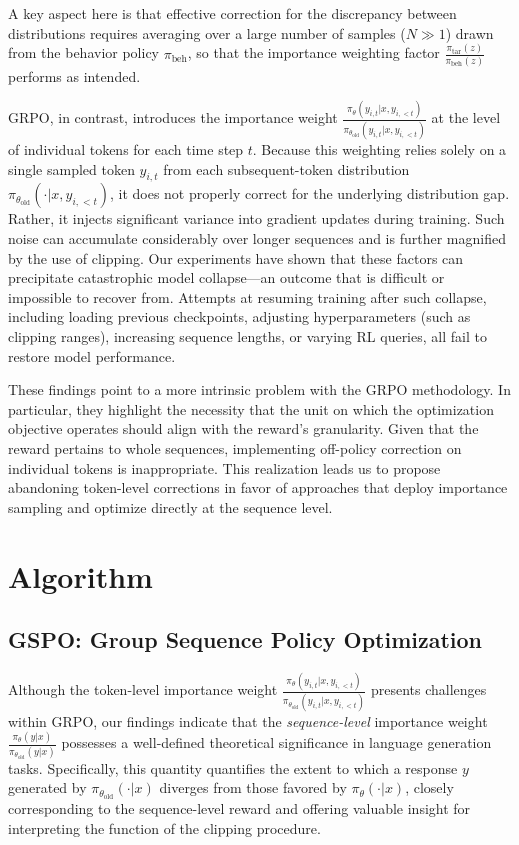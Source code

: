 A key aspect here is that effective correction for the discrepancy between distributions requires averaging over a large number of samples ($N \gg 1$) drawn from the behavior policy $\pi_\text{beh}$, so that the importance weighting factor $\frac{ \pi_\text{tar} (z) }{ \pi_\text{beh} (z)}$ performs as intended.

GRPO, in contrast, introduces the importance weight $\frac{ \pi_{\theta} (y_{i,t} | x, y_{i,<t}) }{ \pi_{\theta_\text{old}} (y_{i,t} | x,y_{i,<t})}$ at the level of individual tokens for each time step $t$. Because this weighting relies solely on a single sampled token $y_{i,t}$ from each subsequent-token distribution $\pi_{\theta_\text{old}}( \cdot | x, y_{i, <t})$, it does not properly correct for the underlying distribution gap. Rather, it injects significant variance into gradient updates during training. Such noise can accumulate considerably over longer sequences and is further magnified by the use of clipping. Our experiments have shown that these factors can precipitate catastrophic model collapse—an outcome that is difficult or impossible to recover from. Attempts at resuming training after such collapse, including loading previous checkpoints, adjusting hyperparameters (such as clipping ranges), increasing sequence lengths, or varying RL queries, all fail to restore model performance.

These findings point to a more intrinsic problem with the GRPO methodology. In particular, they highlight the necessity that the unit on which the optimization objective operates should align with the reward's granularity. Given that the reward pertains to whole sequences, implementing off-policy correction on individual tokens is inappropriate. This realization leads us to propose abandoning token-level corrections in favor of approaches that deploy importance sampling and optimize directly at the sequence level.

\section{Algorithm}

\subsection{GSPO: Group Sequence Policy Optimization}

Although the token-level importance weight $\frac{ \pi_{\theta} (y_{i,t} | x, y_{i,<t}) }{ \pi_{\theta_\text{old}} (y_{i,t} | x,y_{i,<t})}$ presents challenges within GRPO, our findings indicate that the \textit{sequence-level} importance weight $\frac{ \pi_{\theta} (y | x) }{ \pi_{\theta_\text{old}} (y | x)}$ possesses a well-defined theoretical significance in language generation tasks. Specifically, this quantity quantifies the extent to which a response $y$ generated by $\pi_{\theta_\text{old}} (\cdot | x)$ diverges from those favored by $\pi_{\theta} (\cdot | x)$, closely corresponding to the sequence-level reward and offering valuable insight for interpreting the function of the clipping procedure.

